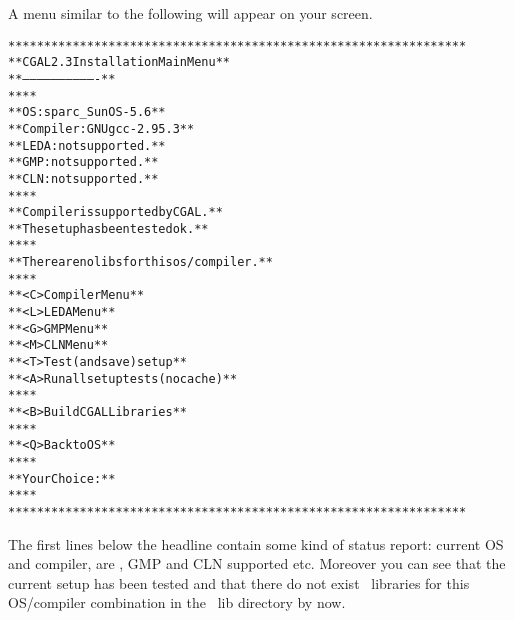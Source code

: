 A menu similar to the following will appear on your screen.

{\ccTexHtml{\scriptsize}{} \label{pic:main-menu}
\begin{alltt}
  ****************************************************************
  **              CGAL 2.3 Installation Main Menu               **
  **              -------------------------------               **
  **                                                            **
  **   OS:                  sparc_SunOS-5.6                     **
  **   Compiler:            GNU gcc-2.95.3                      **
  **   LEDA:                not supported.                      **
  **   GMP:                 not supported.                      **
  **   CLN:                 not supported.                      **
  **                                                            **
  **   Compiler is supported by CGAL.                           **
  **   The setup has been tested ok.                            **
  **                                                            **
  **   There are no libs for this os/compiler.                  **
  **                                                            **
  **   <C>  Compiler Menu                                       **
  **   <L>  LEDA Menu                                           **
  **   <G>  GMP Menu                                            **
  **   <M>  CLN Menu                                            **
  **   <T>  Test (and save) setup                               **
  **   <A>  Run all setup tests (no cache)                      **
  **                                                            **
  **   <B>  Build CGAL Libraries                                **
  **                                                            **
  **   <Q>  Back to OS                                          **
  **                                                            **
  **   Your Choice:                                             **
  **                                                            **
  ****************************************************************
\end{alltt}}

The first lines below the headline contain some kind of status report:
current OS and compiler, are \leda, GMP and CLN supported etc.
Moreover you can see that the current setup has been tested and that
there do not exist \cgal\ libraries for this OS/compiler combination
in the \cgal\ lib directory by now.

